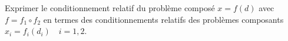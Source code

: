 
\begin{exercice}\label{exoSerieUn0005}

Exprimer le conditionnement relatif du problème composé $x=f(d)$ avec $f=f_1\circ f_2$ en termes des conditionnements relatifs des problèmes composants $x_i=f_i(d_i)\quad i=1,2$.

\end{exercice}
